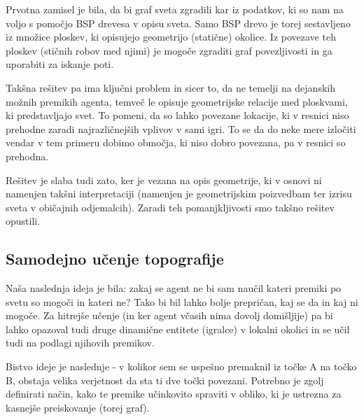 \documentclass[a4paper,10pt]{article}
\begin{document}
Prvotna zamisel je bila, da bi graf sveta zgradili kar iz podatkov, ki so nam na voljo s pomočjo BSP drevesa v opisu sveta. Samo BSP drevo je torej sestavljeno iz množice ploskev, ki opisujejo geometrijo (statične) okolice. Iz povezave teh ploskev (stičnih robov med njimi) je mogoče zgraditi graf povezljivosti in ga uporabiti za iskanje poti.

Takšna rešitev pa ima ključni problem in sicer to, da ne temelji na dejanskih možnih premikih agenta, temveč le opisuje geometrijske relacije med ploskvami, ki predstavljajo svet. To pomeni, da so lahko povezane lokacije, ki v resnici niso prehodne zaradi najrazličnejših vplivov v sami igri. To se da do neke mere izločiti vendar v tem primeru dobimo območja, ki niso dobro povezana, pa v resnici so prehodna.

Rešitev je slaba tudi zato, ker je vezana na opis geometrije, ki v osnovi ni namenjen takšni interpretaciji (namenjen je geometrijskim poizvedbam ter izrisu sveta v običajnih odjemalcih). Zaradi teh pomanjkljivosti smo takšno rešitev opustili.

\subsection{Samodejno učenje topografije}

Naša naslednja ideja je bila: zakaj se agent ne bi sam naučil kateri premiki po svetu so mogoči in kateri ne? Tako bi bil lahko bolje prepričan, kaj se da in kaj ni mogoče. Za hitrejše učenje (in ker agent včasih nima dovolj domišljije) pa bi lahko opazoval tudi druge dinamične entitete (igralce) v lokalni okolici in se učil tudi na podlagi njihovih premikov.

Bistvo ideje je naslednje - v kolikor sem se uspešno premaknil iz točke A na točko B, obstaja velika verjetnost da sta ti dve točki povezani. Potrebno je zgolj definirati način, kako te premike učinkovito spraviti v obliko, ki je ustrezna za kasnejše preiskovanje (torej graf).
\end{document}
